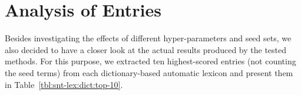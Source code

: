 
\section{Analysis of Entries}\label{subsec:snt-lex:aoe}

Besides investigating the effects of different hyper-parameters and
seed sets, we also decided to have a closer look at the actual results
produced by the tested methods.  For this purpose, we extracted ten
highest-scored entries (not counting the seed terms) from each
dictionary-based automatic lexicon and present them in
Table~\ref{tbl:snt-lex:dict:top-10}.

